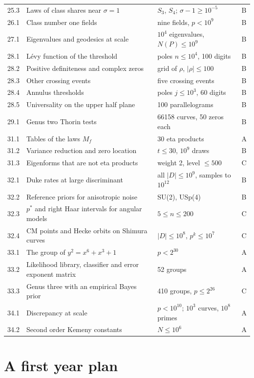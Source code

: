 {\begin{longtable}{p{0.9cm}p{5.3cm}p{3.0cm}p{0.5cm}}
25.3 & Laws of class shares near $\sigma=1$ & $S_3$, $S_4$; $\sigma-1\ge10^{-5}$ & B\\
26.1 & Class number one fields & nine fields, $p<10^9$ & B\\
27.1 & Eigenvalues and geodesics at scale & $10^4$ eigenvalues, $N(P)\le10^9$ & B\\
28.1 & Lévy function of the threshold & poles $n\le10^4$, 100 digits & B\\
28.2 & Positive definiteness and complex zeros & grid of $\rho$, $|\rho|\le100$ & B\\
28.3 & Other crossing events & five crossing events & B\\
28.4 & Annulus thresholds & poles $j\le10^3$, 60 digits & B\\
28.5 & Universality on the upper half plane & 100 parallelograms & B\\
29.1 & Genus two Thorin tests & 66158 curves, 50 zeros each & B\\
31.1 & Tables of the laws $M_f$ & 30 eta products & A\\
31.2 & Variance reduction and zero location & $t\le30$, $10^9$ draws & B\\
31.3 & Eigenforms that are not eta products & weight 2, level $\le500$ & C\\
32.1 & Duke rates at large discriminant & all $|D|\le10^9$, samples to $10^{12}$ & B\\
32.2 & Reference priors for anisotropic noise & SU(2), USp(4) & B\\
32.3 & $p^*$ and right Haar intervals for angular models & $5\le n\le200$ & C\\
32.4 & CM points and Hecke orbits on Shimura curves & $|D|\le10^8$, $p^k\le10^7$ & C\\
33.1 & The group of $y^2=x^6+x^3+1$ & $p<2^{30}$ & A\\
33.2 & Likelihood library, classifier and error exponent matrix & 52 groups & A\\
33.3 & Genus three with an empirical Bayes prior & 410 groups, $p\le2^{26}$ & C\\
34.1 & Discrepancy at scale & $p<10^{10}$; $10^3$ curves, $10^8$ primes & A\\
34.2 & Second order Kemeny constants & $N \le 10^6$ & A\\
\bottomrule
\end{longtable}
}

\section{A first year plan}

